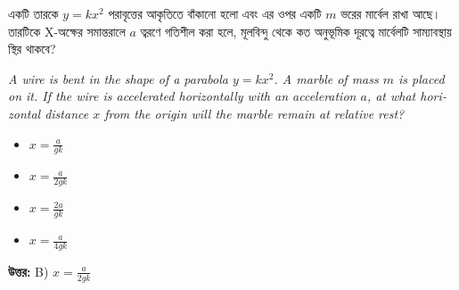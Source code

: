 \documentclass[12pt, a4paper]{article}
\begin{document}
\newpage

\begin{tcolorbox}[questionbox={প্রশ্ন (Question) 32}]
\noindent
একটি তারকে $y = k x^2$ পরাবৃত্তের আকৃতিতে বাঁকানো হলো এবং এর ওপর একটি $m$ ভরের মার্বেল রাখা আছে। তারটিকে X-অক্ষের সমান্তরালে $a$ ত্বরণে গতিশীল করা হলে, মূলবিন্দু থেকে কত অনুভূমিক দূরত্বে মার্বেলটি সাম্যাবস্থায় স্থির থাকবে?
\vspace{0.8em}
\begin{english}
\noindent\textit{\color{darkgray}
A wire is bent in the shape of a parabola $y = k x^2$. A marble of mass $m$ is placed on it. If the wire is accelerated horizontally with an acceleration $a$, at what horizontal distance $x$ from the origin will the marble remain at relative rest?
}
\end{english}
\end{tcolorbox}

\begin{itemize}[label={}, leftmargin=1cm, itemsep=0.5em]
\item[\textbf{A)}] $x = \frac{a}{gk}$
\item[\textbf{B)}] $x = \frac{a}{2gk}$
\item[\textbf{C)}] $x = \frac{2a}{gk}$
\item[\textbf{D)}] $x = \frac{a}{4gk}$
\end{itemize}
\vspace{0.5em}

\begin{tcolorbox}[answerbox]
\textbf{\color{success} উত্তর:} B) $x = \frac{a}{2gk}$
\end{tcolorbox}
\vspace{1em}
\end{document}
